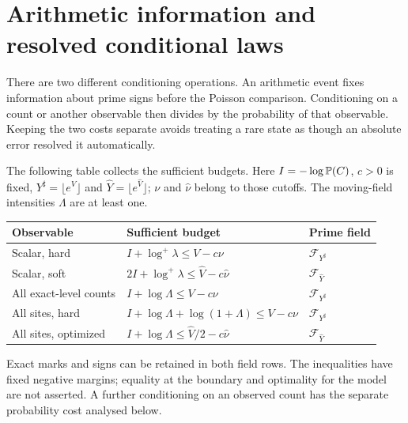 \section{Arithmetic information and resolved conditional laws}
\label{sec:conditional-laws}
There are two different conditioning operations. An arithmetic event fixes
information about prime signs before the Poisson comparison. Conditioning
on a count or another observable then divides by the probability of that
observable. Keeping the two costs separate avoids treating a rare state as
though an absolute error resolved it automatically.


The following table collects the sufficient budgets. Here $I=-\log\mathbb P(C)$,
$c>0$ is fixed, $Y^\sharp=\lfloor e^V\rfloor$ and
$\widehat Y=\lfloor e^{\widehat V}\rfloor$; $\nu$ and $\widehat\nu$ belong
to those cutoffs. The moving-field intensities $\Lambda$ are at least one.
\begin{center}\small
\begin{tabularx}{\textwidth}{@{}lXl@{}}\toprule
Observable & Sufficient budget & Prime field\\\midrule
Scalar, hard & $I+\log^+\lambda\le V-c\nu$ & $\mathcal F_{Y^\sharp}$\\
Scalar, soft & $2I+\log^+\lambda\le\widehat V-c\widehat\nu$ & $\mathcal F_{\widehat Y}$\\
All exact-level counts & $I+\log\Lambda\le V-c\nu$ & $\mathcal F_{Y^\sharp}$\\
All sites, hard & $I+\log\Lambda+\log(1+\Lambda)\le V-c\nu$ & $\mathcal F_{Y^\sharp}$\\
All sites, optimized & $I+\log\Lambda\le\widehat V/2-c\widehat\nu$ & $\mathcal F_{\widehat Y}$\\\bottomrule
\end{tabularx}
\end{center}
Exact marks and signs can be retained in both field rows. The inequalities
have fixed negative margins; equality at the boundary and optimality for
the model are not asserted. A further conditioning on an observed count
has the separate probability cost analysed below.

